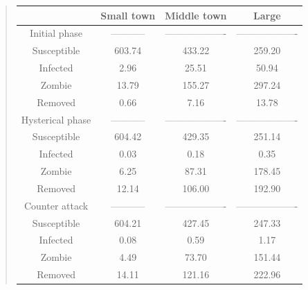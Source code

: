 \documentclass[%
twoside,                 %
final,                   %
10pt]{article}
\begin{document}
\label{table:compare_towns}

\begin{quote}
\begin{tabular}{cccc}
\hline
\multicolumn{1}{c}{  } & \multicolumn{1}{c}{ Small town } & \multicolumn{1}{c}{ Middle town } & \multicolumn{1}{c}{ Large } \\
\hline
Initial phase    & ----------- & ------------------- & ------------------- \\
\hline
Susceptible      & 603.74      & 433.22              & 259.20              \\
Infected         & 2.96        & 25.51               & 50.94               \\
Zombie           & 13.79       & 155.27              & 297.24              \\
Removed          & 0.66        & 7.16                & 13.78               \\
\hline
Hysterical phase & ----------- & ------------------- & ------------------- \\
\hline
Susceptible      & 604.42      & 429.35              & 251.14              \\
Infected         & 0.03        & 0.18                & 0.35                \\
Zombie           & 6.25        & 87.31               & 178.45              \\
Removed          & 12.14       & 106.00              & 192.90              \\
\hline
Counter attack   & ----------- & ------------------- & ------------------- \\
\hline
Susceptible      & 604.21      & 427.45              & 247.33              \\
Infected         & 0.08        & 0.59                & 1.17                \\
Zombie           & 4.49        & 73.70               & 151.44              \\
Removed          & 14.11       & 121.16              & 222.96              \\
\hline
\end{tabular}
\end{quote}

\noindent
\end{document}
